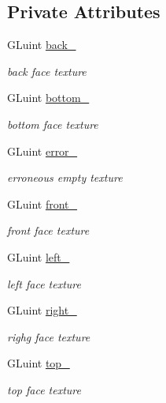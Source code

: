 \subsection*{Private Attributes}
\begin{DoxyCompactItemize}
\item 
G\+Luint \hyperlink{classSkinBox__t_adebfd88d0aafaa70847ad7c0f21b7d4c}{back\+\_\+}
\begin{DoxyCompactList}\small\item\em back face texture \end{DoxyCompactList}\item 
G\+Luint \hyperlink{classSkinBox__t_a4866e3d2256c7aba8215931309f8a2f6}{bottom\+\_\+}
\begin{DoxyCompactList}\small\item\em bottom face texture \end{DoxyCompactList}\item 
G\+Luint \hyperlink{classSkinBox__t_a44086026a34e4269634d20954617a004}{error\+\_\+}
\begin{DoxyCompactList}\small\item\em erroneous empty texture \end{DoxyCompactList}\item 
G\+Luint \hyperlink{classSkinBox__t_a4c289429282548bcafa495529e771725}{front\+\_\+}
\begin{DoxyCompactList}\small\item\em front face texture \end{DoxyCompactList}\item 
G\+Luint \hyperlink{classSkinBox__t_a0c5a8370ea6676f59c6d49a68bfa3ce2}{left\+\_\+}
\begin{DoxyCompactList}\small\item\em left face texture \end{DoxyCompactList}\item 
G\+Luint \hyperlink{classSkinBox__t_af4fe3372619e9a7e49d4495b332dbe8e}{right\+\_\+}
\begin{DoxyCompactList}\small\item\em righg face texture \end{DoxyCompactList}\item 
G\+Luint \hyperlink{classSkinBox__t_a2660ed9c1a6e662b697ea23a3710248d}{top\+\_\+}
\begin{DoxyCompactList}\small\item\em top face texture \end{DoxyCompactList}\end{DoxyCompactItemize}


